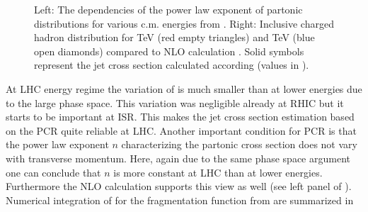 \documentclass[12pt]{article}
\begin{document}
\begin{figure}[htbp]
   \caption{Left: The \pt{} dependencies of the power law exponent of partonic distributions for various c.m. energies from \cite{Horowitz:2011gd}. Right: Inclusive charged hadron \pt{} distribution for  TeV (red empty triangles) and  TeV (blue open diamonds) compared to NLO calculation \cite{Jager:2002xm}. Solid symbols represent the jet cross section calculated according  
   (values in ).}  
\end{figure}

At LHC energy regime the \pt{} variation of  is much smaller than at lower energies due to the large phase space. This variation 
was negligible already at RHIC but it starts to be important at ISR. This makes the jet cross section estimation based on the PCR quite reliable at LHC. Another important condition for PCR is that the power law exponent $n$ characterizing the partonic cross section does not
vary with transverse momentum. Here, again due to the same phase space argument one can conclude that $n$ is more constant at LHC than at lower energies. Furthermore the NLO calculation supports this view as well \cite{Horowitz:2011gd} (see left panel of ). Numerical integration of  for the fragmentation function from  are summarized in 
\end{document}
